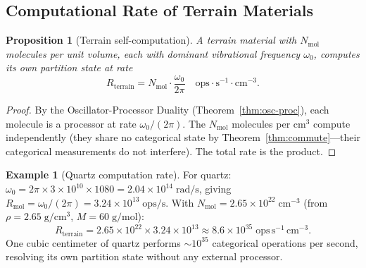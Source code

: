 \documentclass[10pt,twocolumn]{article}
\newtheorem{proposition}[theorem]{Proposition}
\theoremstyle{definition}
\newtheorem{example}[theorem]{Example}
\theoremstyle{remark}
\begin{document}
\subsection{Computational Rate of Terrain Materials}
\label{sec:comp_rate}

\begin{proposition}[Terrain self-computation]
\label{prop:selfcomp}
A terrain material with $N_{\mathrm{mol}}$ molecules per unit
volume, each with dominant vibrational frequency $\omega_0$,
computes its own partition state at rate
\begin{equation}\label{eq:Rterrain}
  R_{\mathrm{terrain}} = N_{\mathrm{mol}}\cdot
  \frac{\omega_0}{2\pi}\quad\text{ops}\cdot\mathrm{s^{-1}
  \cdot cm^{-3}}.
\end{equation}
\end{proposition}

\begin{proof}
By the Oscillator-Processor Duality
(Theorem~\ref{thm:osc-proc}), each molecule is a processor
at rate $\omega_0/(2\pi)$.  The $N_{\mathrm{mol}}$ molecules
per $\mathrm{cm^3}$ compute independently (they share no
categorical state by Theorem~\ref{thm:commute}---their
categorical measurements do not interfere).  The total rate is
the product.
\end{proof}

\begin{example}[Quartz computation rate]
For quartz: $\omega_0 = 2\pi\times 3\times 10^{10}\times 1080
= 2.04\times 10^{14}\;\mathrm{rad/s}$, giving
$R_{\mathrm{mol}} = \omega_0/(2\pi) = 3.24\times
10^{13}\;\mathrm{ops/s}$.  With $N_{\mathrm{mol}} =
2.65\times 10^{22}\;\mathrm{cm^{-3}}$ (from
$\rho=2.65\;\mathrm{g/cm^3}$, $M=60\;\mathrm{g/mol}$):
\begin{equation}
  R_{\mathrm{terrain}} = 2.65\times 10^{22}\times
  3.24\times 10^{13} \approx 8.6\times 10^{35}
  \;\mathrm{ops\,s^{-1}\,cm^{-3}}.
\end{equation}
One cubic centimeter of quartz performs $\sim 10^{35}$
categorical operations per second, resolving its own partition
state without any external processor.
\end{example}
\end{document}
